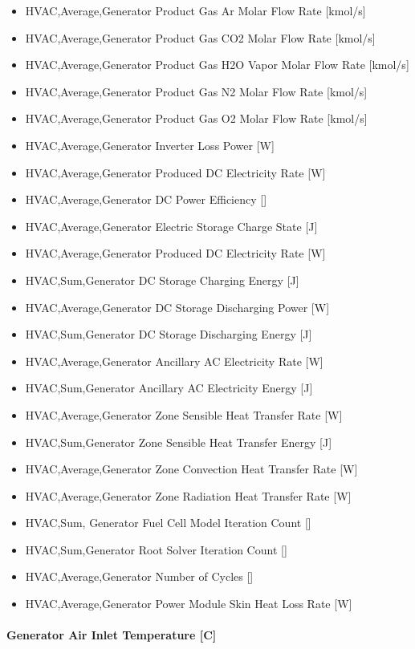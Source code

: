 \begin{itemize}
\item
  HVAC,Average,Generator Product Gas Ar Molar Flow Rate {[}kmol/s{]}
\item
  HVAC,Average,Generator Product Gas CO2 Molar Flow Rate {[}kmol/s{]}
\item
  HVAC,Average,Generator Product Gas H2O Vapor Molar Flow Rate {[}kmol/s{]}
\item
  HVAC,Average,Generator Product Gas N2 Molar Flow Rate {[}kmol/s{]}
\item
  HVAC,Average,Generator Product Gas O2 Molar Flow Rate {[}kmol/s{]}
\item
  HVAC,Average,Generator Inverter Loss Power {[}W{]}
\item
  HVAC,Average,Generator Produced DC Electricity Rate {[}W{]}
\item
  HVAC,Average,Generator DC Power Efficiency {[]}
\item
  HVAC,Average,Generator Electric Storage Charge State {[}J{]}
\item
  HVAC,Average,Generator Produced DC Electricity Rate {[}W{]}
\item
  HVAC,Sum,Generator DC Storage Charging Energy {[}J{]}
\item
  HVAC,Average,Generator DC Storage Discharging Power {[}W{]}
\item
  HVAC,Sum,Generator DC Storage Discharging Energy {[}J{]}
\item
  HVAC,Average,Generator Ancillary AC Electricity Rate {[}W{]}
\item
  HVAC,Sum,Generator Ancillary AC Electricity Energy {[}J{]}
\item
  HVAC,Average,Generator Zone Sensible Heat Transfer Rate {[}W{]}
\item
  HVAC,Sum,Generator Zone Sensible Heat Transfer Energy {[}J{]}
\item
  HVAC,Average,Generator Zone Convection Heat Transfer Rate {[}W{]}
\item
  HVAC,Average,Generator Zone Radiation Heat Transfer Rate {[}W{]}
\item
  HVAC,Sum, Generator Fuel Cell Model Iteration Count {[]}
\item
  HVAC,Sum,Generator Root Solver Iteration Count {[]}
\item
  HVAC,Average,Generator Number of Cycles {[]}
\item
  HVAC,Average,Generator Power Module Skin Heat Loss Rate {[}W{]}
\end{itemize}

\paragraph{Generator Air Inlet Temperature {[}C{]}}\label{generator-air-inlet-temperature-c}

